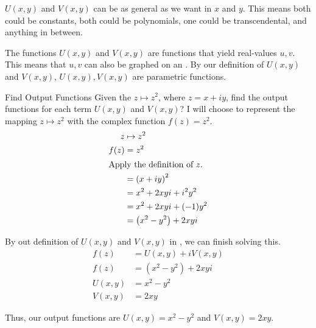 $U(x, y)$ and $V(x, y)$ can be as general as we want in $x$ and $y$.
This means both could be constants, both could be polynomials, one could be transcendental, and anything in between.

The functions $U(x, y)$ and $V(x, y)$ are functions that yield real-values $u, v$.
This means that $u, v$ can also be graphed on an .
By our definition of $U(x, y)$ and $V(x, y)$, $U(x, y), V(x, y)$ are parametric functions.

\begin{example}[Lecture 4]{Find Output Functions}
  Given the  $z \mapsto z^{2}$, where $z = x + iy$, find the output functions for each term $U(x, y)$ and $V(x, y)$?
  \tcblower{}
  I will choose to represent the mapping $z \mapsto z^{2}$ with the complex function $f(z) = z^{2}$.
  \begin{align*}
    z &\mapsto z^{2} \\
    f(z) &= z^{2} \\
    \shortintertext{Apply the definition of $z$.}
      &= {(x + iy)}^{2} \\
      &= x^{2} + 2xyi + i^{2}y^{2} \\
      &= x^{2} + 2xyi + (-1)y^{2} \\
      &= \left( x^{2} - y^{2} \right) + 2xyi \\
  \end{align*}

  By out definition of $U(x, y)$ and $V(x, y)$ in , we can finish solving this.
  \begin{align*}
    f(z) &= U(x, y) + iV(x, y) \\
    f(z) &= \left( x^{2} - y^{2} \right) + 2xyi \\
    U(x, y) &= x^{2} - y^{2} \\
    V(x, y) &= 2xy
  \end{align*}

  Thus, our output functions are $U(x, y) = x^{2} - y^{2}$ and $V(x, y) = 2xy$.
\end{example}











